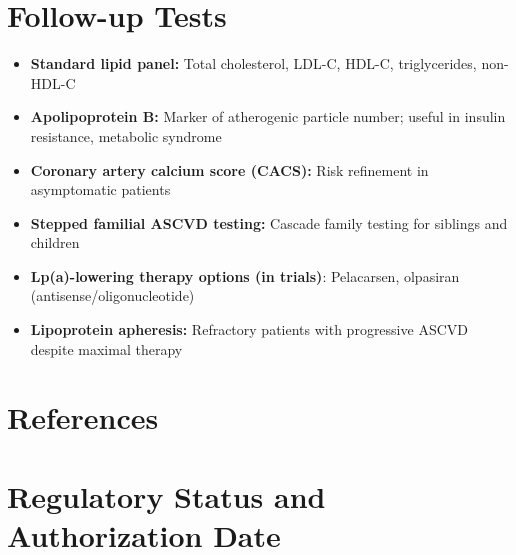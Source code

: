\section*{Follow-up Tests}
\begin{itemize}
  \item \textbf{Standard lipid panel:} Total cholesterol, LDL-C, HDL-C, triglycerides, non-HDL-C
  \item \textbf{Apolipoprotein B:} Marker of atherogenic particle number; useful in insulin resistance, metabolic syndrome
  \item \textbf{Coronary artery calcium score (CACS):} Risk refinement in asymptomatic patients
  \item \textbf{Stepped familial ASCVD testing:} Cascade family testing for siblings and children
  \item \textbf{Lp(a)-lowering therapy options (in trials)}: Pelacarsen, olpasiran (antisense/oligonucleotide)
  \item \textbf{Lipoprotein apheresis:} Refractory patients with progressive ASCVD despite maximal therapy
\end{itemize}

\section*{References}



\clearpage
\section*{Regulatory Status and Authorization Date}

\clearpage
